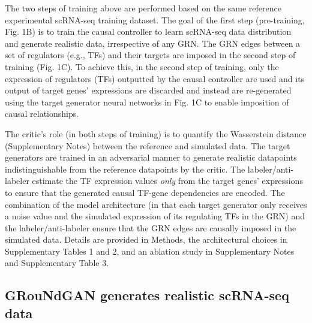The two steps of training above are performed based on the same reference experimental scRNA-seq training dataset. The goal of the first step (pre-training, Fig. 1B) is to train the causal controller to learn scRNA-seq data distribution and generate realistic data, irrespective of any GRN. The GRN edges between a set of regulators (e.g., TFs) and their targets are imposed in the second step of training (Fig. 1C). To achieve this, in the second step of training, only the expression of regulators (TFs) outputted by the causal controller are used and its output of target genes’ expressions are discarded and instead are re-generated using the target generator neural networks in Fig. 1C to enable imposition of causal relationships.

The critic’s role (in both steps of training) is to quantify the Wasserstein distance (Supplementary Notes) between the reference and simulated data. The target generators are trained in an adversarial manner to generate realistic datapoints indistinguishable from the reference datapoints by the critic. The labeler/anti-labeler estimate the TF expression values \textit{only} from the target genes’ expressions to ensure that the generated causal TF-gene dependencies are encoded. The combination of the model architecture (in that each target generator only receives a noise value and the simulated expression of its regulating TFs in the GRN) and the labeler/anti-labeler ensure that the GRN edges are causally imposed in the simulated data. Details are provided in Methods, the architectural choices in Supplementary Tables 1 and 2, and an ablation study in Supplementary Notes and Supplementary Table 3. %

\subsection*{GRouNdGAN generates realistic scRNA-seq data}


